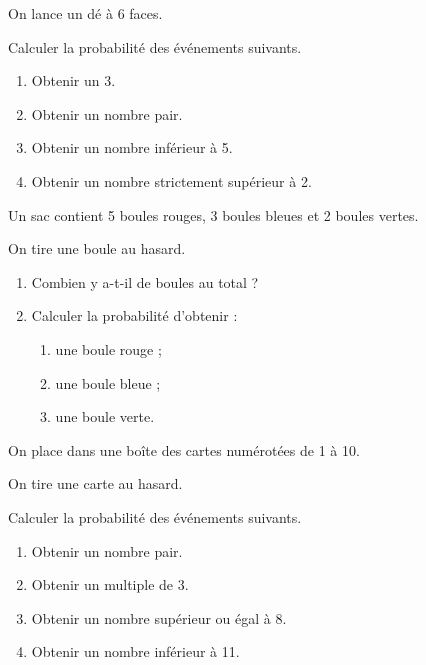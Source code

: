 \documentclass[11pt]{article}
\begin{document}
\begin{exercice}

On lance un dé à 6 faces.

Calculer la probabilité des événements suivants.

\begin{enumerate}
    \item Obtenir un 3.
    \item Obtenir un nombre pair.
    \item Obtenir un nombre inférieur à 5.
    \item Obtenir un nombre strictement supérieur à 2.
\end{enumerate}

\end{exercice}


\begin{exercice}

Un sac contient 5 boules rouges, 3 boules bleues et 2 boules vertes.

On tire une boule au hasard.

\begin{enumerate}
    \item Combien y a-t-il de boules au total ?
    \item Calculer la probabilité d'obtenir :
    \begin{enumerate}
        \item une boule rouge ;
        \item une boule bleue ;
        \item une boule verte.
    \end{enumerate}
\end{enumerate}

\end{exercice}


\begin{exercice}

On place dans une boîte des cartes numérotées de 1 à 10.

On tire une carte au hasard.

Calculer la probabilité des événements suivants.

\begin{enumerate}
    \item Obtenir un nombre pair.
    \item Obtenir un multiple de 3.
    \item Obtenir un nombre supérieur ou égal à 8.
    \item Obtenir un nombre inférieur à 11.
\end{enumerate}

\end{exercice}
\end{document}
